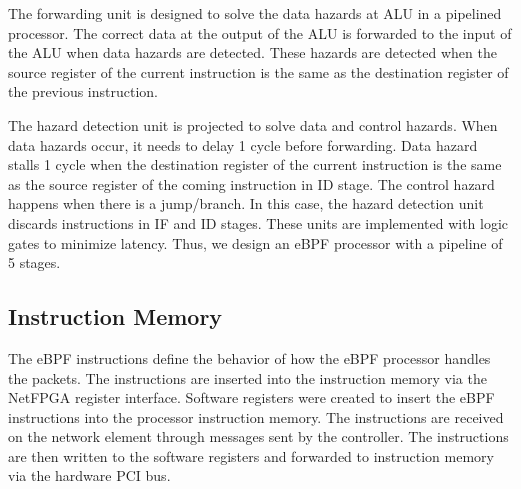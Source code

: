The forwarding unit is designed to solve the data hazards at ALU in a pipelined processor. The correct data at the output of the ALU is forwarded to the input of the ALU when data hazards are detected. These hazards are detected when the source register of the current instruction is the same as the destination register of the previous instruction.

The hazard detection unit is projected to solve data and control hazards. When data hazards occur, it needs to delay 1 cycle before forwarding.
Data hazard stalls 1 cycle when the destination register of the current instruction is the same as the source register of the coming instruction in ID stage. The control hazard happens when there is a jump/branch. In this case, the hazard detection unit discards instructions in IF and ID stages.
These units are implemented with logic gates to minimize latency.
Thus, we design an eBPF processor with a pipeline of 5 stages.


\subsection{Instruction Memory} 



The eBPF instructions define the behavior of how the eBPF processor handles the packets. The instructions are inserted into the instruction memory via the NetFPGA register interface. Software registers were created to insert the eBPF instructions into the processor instruction memory. The instructions are received on the network element through messages sent by the controller. The instructions are then written to the software registers and forwarded to instruction memory via the hardware PCI bus.

